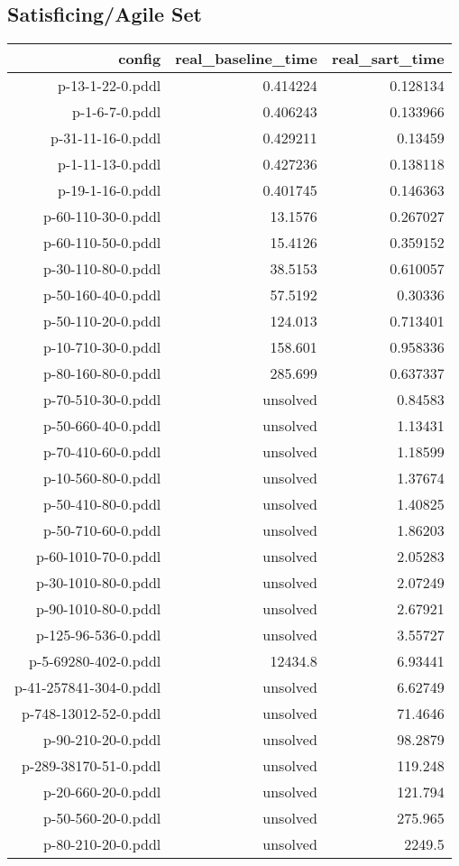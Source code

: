 \documentclass{article}
\begin{document}
                    
                    \subsection*{Satisficing/Agile Set}
                    
                            \begin{center}
                            \scriptsize
                            \begin{tabular}{r|r|r}
                            config & real\_baseline\_time & real\_sart\_time\\\midrule
                             p-13-1-22-0.pddl&0.414224&0.128134\\
 p-1-6-7-0.pddl&0.406243&0.133966\\
 p-31-11-16-0.pddl&0.429211&0.13459\\
 p-1-11-13-0.pddl&0.427236&0.138118\\
 p-19-1-16-0.pddl&0.401745&0.146363\\
 p-60-110-30-0.pddl&13.1576&0.267027\\
 p-60-110-50-0.pddl&15.4126&0.359152\\
 p-30-110-80-0.pddl&38.5153&0.610057\\
 p-50-160-40-0.pddl&57.5192&0.30336\\
 p-50-110-20-0.pddl&124.013&0.713401\\
 p-10-710-30-0.pddl&158.601&0.958336\\
 p-80-160-80-0.pddl&285.699&0.637337\\
 p-70-510-30-0.pddl&unsolved&0.84583\\
 p-50-660-40-0.pddl&unsolved&1.13431\\
 p-70-410-60-0.pddl&unsolved&1.18599\\
 p-10-560-80-0.pddl&unsolved&1.37674\\
 p-50-410-80-0.pddl&unsolved&1.40825\\
 p-50-710-60-0.pddl&unsolved&1.86203\\
 p-60-1010-70-0.pddl&unsolved&2.05283\\
 p-30-1010-80-0.pddl&unsolved&2.07249\\
 p-90-1010-80-0.pddl&unsolved&2.67921\\
 p-125-96-536-0.pddl&unsolved&3.55727\\
 p-5-69280-402-0.pddl&12434.8&6.93441\\
 p-41-257841-304-0.pddl&unsolved&6.62749\\
 p-748-13012-52-0.pddl&unsolved&71.4646\\
 p-90-210-20-0.pddl&unsolved&98.2879\\
 p-289-38170-51-0.pddl&unsolved&119.248\\
 p-20-660-20-0.pddl&unsolved&121.794\\
 p-50-560-20-0.pddl&unsolved&275.965\\
 p-80-210-20-0.pddl&unsolved&2249.5
                            \end{tabular}
                            \end{center}
                    
\end{document}
